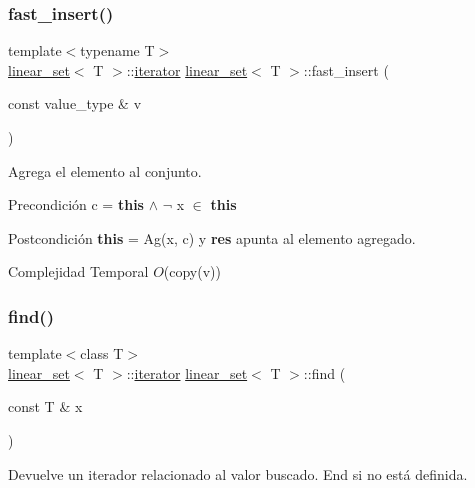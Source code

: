 \subsubsection{\texorpdfstring{fast\+\_\+insert()}{fast\_insert()}}
{\footnotesize\ttfamily template$<$typename T$>$ \\
\mbox{\hyperlink{classlinear__set}{linear\+\_\+set}}$<$ T $>$\+::\mbox{\hyperlink{classlinear__set_1_1iterator}{iterator}} \mbox{\hyperlink{classlinear__set}{linear\+\_\+set}}$<$ T $>$\+::fast\+\_\+insert (\begin{DoxyParamCaption}\item[{const value\+\_\+type \&}]{v }\end{DoxyParamCaption})}



Agrega el elemento al conjunto. 

\begin{DoxyPrecond}{Precondición}
c = {\bfseries this} $\land$ $\lnot$ x $\in$ {\bfseries this} 
\end{DoxyPrecond}
\begin{DoxyPostcond}{Postcondición}
{\bfseries this} = Ag(x, c) y {\bfseries res} apunta al elemento agregado.
\end{DoxyPostcond}

\begin{DoxyDescription}
\item[Complejidad Temporal]$O$(copy(v))
\end{DoxyDescription}\mbox{\label{classlinear__set_a415e0c8461f6a702129b7612a538ffb1}} 
\subsubsection{\texorpdfstring{find()}{find()}}
{\footnotesize\ttfamily template$<$class T$>$ \\
\mbox{\hyperlink{classlinear__set}{linear\+\_\+set}}$<$ T $>$\+::\mbox{\hyperlink{classlinear__set_1_1iterator}{iterator}} \mbox{\hyperlink{classlinear__set}{linear\+\_\+set}}$<$ T $>$\+::find (\begin{DoxyParamCaption}\item[{const T \&}]{x }\end{DoxyParamCaption})}



Devuelve un iterador relacionado al valor buscado. End si no está definida. 

